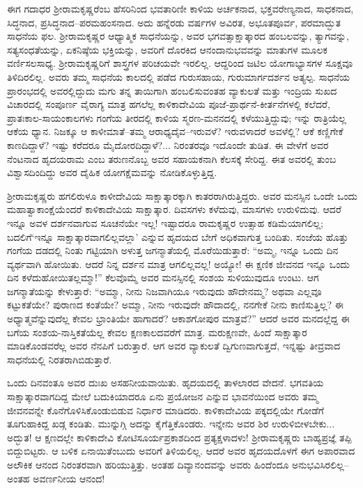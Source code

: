 ಈಗ ಗದಾಧರ ಶ್ರೀರಾಮಕೃಷ್ಣರೆಂಬ ಹೆಸರಿನಿಂದ ಭವತಾರಿಣೀ ಕಾಳಿಯ ಅರ್ಚಕನಾದ, ಭಕ್ತವರೇಣ್ಯನಾದ, ಸಾಧಕನಾದ, ಸಿದ್ಧನಾದ, ಪ್ರಸಿದ್ಧನಾದ–ಪರಮಹಂಸನಾದ. ಅದು ಹನ್ನೆರಡು ವರ್ಷಗಳ ಅವಿರತ, ಅಭೂತಪೂರ್ವ, ಪರಮಾದ್ಭುತ ಸಾಧನೆಯ ಫಲ. ಶ್ರೀರಾಮಕೃಷ್ಣರ ಆಧ್ಯಾತ್ಮಿಕ ಸಾಧನೆಯನ್ನು, ಅವರ ಭಗವತ್ಸಾಕ್ಷಾತ್ಕಾರದ ಹಂಬಲವನ್ನು, ತ್ಯಾಗವನ್ನು, ಸತ್ಯಸಂಧತೆಯನ್ನು, ಏಕನಿಷ್ಠೆಯ ಭಕ್ತಿಯನ್ನು, ಅವರಿಗೆ ದೊರಕಿದ ಆನಂದಾನುಭವವನ್ನು ಮಾತುಗಳ ಮೂಲಕ ವರ್ಣಿಸಲಸಾಧ್ಯ. ಶ್ರೀರಾಮಕೃಷ್ಣರಿಗೆ ಶಾಸ್ತ್ರಗಳ ಪರಿಚಯವೇ ಇರಲಿಲ್ಲ. ಆದ್ದರಿಂದ ಜಟಿಲ ಯೋಗಾಭ್ಯಾಸಗಳ ಸೂಕ್ಷವೂ ತಿಳಿದಿರಲಿಲ್ಲ. ಅವರು ತಮ್ಮ ಸಾಧನೆಯ ಕಾಲದಲ್ಲಿ ಪಡೆದ ಗುರುಸಹಾಯ, ಗುರುಮಾರ್ಗದರ್ಶನ ಅತ್ಯಲ್ಪ. ಸಾಧನೆಯ ಪ್ರಾರಂಭದಲ್ಲಿ ಅವರಲ್ಲಿದ್ದುದು ಮಗು ತನ್ನ ತಾಯಿಗಾಗಿ ಹಂಬಲಿಸುವಂತಹ ವ್ಯಾಕುಲತೆ ಮತ್ತು ಇಂದ್ರಿಯ ಸುಖದ ವಿಚಾರದಲ್ಲಿ ಸಂಪೂರ್ಣ ವೈರಾಗ್ಯ ಮಾತ್ರ ಹಗಲೆಲ್ಲ ಕಾಳಿಕಾದೇವಿಯ ಪೂಜೆ-ಪ್ರಾರ್ಥನೆ-ಕೀರ್ತನೆಗಳಲ್ಲಿ ಕಲೆದರೆ, ಪ್ರಾತಃಕಾಲ-ಸಾಯಂಕಾಲಗಳು ಗಂಗೆಯ ತೀರದಲ್ಲಿ ಕಾಳಿಯ ಸ್ಮರಣ-ಮನನದಲ್ಲಿ ಕಳೆಯುತ್ತಿದ್ದುವು; ಇನ್ನು ರಾತ್ರಿಯೆಲ್ಲ ಆಕೆಯ ಧ್ಯಾನ. ನಿಜಕ್ಕೂ ಆ ಕಾಳೀಮಾತೆ–ತಮ್ಮ ಆರಾಧ್ಯದೈವ–ಇರುವಳೆ? ಇರುವಳಾದರೆ ಅವಳೆಲ್ಲಿ? ಆಕೆ ಕಣ್ಣಿಗೇಕೆ ಕಾಣದಿದ್ದಾಳೆ? ಇಷ್ಟು ಕರೆದರೂ ಮೈದೋರದಿದ್ದಾಳೆ?... ನಿರಂತರವೂ ಇದೊಂದೇ ತುಡಿತ. ಈ ವೇಳೆಗೆ ಅವರ ನೆಂಟನಾದ ಹೃದಯರಾಮ ಎಂಬ ತರುಣನೊಬ್ಬ ಅವರ ಸಹಾಯಕನಾಗಿ ಕೆಲಸಕ್ಕೆ ಸೇರಿದ್ದ. ಈತ ಅವರಲ್ಲಿ ತುಂಬ ವಿಶ್ವಾಸದಿಂದಿದ್ದು ಅವರ ದೈಹಿಕ ಯೋಗಕ್ಷೆಮವನ್ನು ನೋಡಿಕೊಳ್ಳುತ್ತಿದ್ದ.

ಶ್ರೀರಾಮಕೃಷ್ಣರು ಹಗಲಿರುಳೂ ಕಾಳೀದೇವಿಯ ಸಾಕ್ಷಾತ್ಕಾರಕ್ಕಾಗಿ ಕಾತರರಾಗಿರುತ್ತಿದ್ದರು. ಅವರ ಮನಸ್ಸಿನ ಒಂದೇ ಒಂದು ಮಹಾತ್ವಾಕಾಂಕ್ಷೆಯೆಂದರೆ ಕಾಳಿಕಾದೇವಿಯ ಸಾಕ್ಷಾತ್ಕಾರ. ದಿವಸಗಳು ಕಳೆದುವು, ಮಾಸಗಳು ಉರುಳಿದುವು. ಆದರೆ ಇನ್ನೂ ಅವಳ ದರ್ಶನವಾಗುವ ಸೂಚನೆಯೇ ಇಲ್ಲ! ಇಷ್ಟಾದರೂ ರಾಮಕೃಷ್ಣರ ಉತ್ಸಾಹ ಕಡಿಮೆಯಾಗಲಿಲ್ಲ; ಬದಲಿಗೆ‘ಇನ್ನೂ ಸಾಕ್ಷಾತ್ಕಾರವಾಗಲಿಲ್ಲವಲ್ಲಾ’ ಎನ್ನುವ ಹೃದಯದ ಬೇಗೆ ಅಧಿಕವಾಗುತ್ತ ಬಂದಿತು. ಸಂಜೆಯ ಹೊತ್ತು ಗಂಗೆಯ ದಡದಲ್ಲಿ ನಿಂತು ಗಟ್ಟಿಯಾಗಿ ಅಳುತ್ತ ಜಗನ್ಮಾತೆಯಲ್ಲಿ ಮೊರೆಯಿಡುತ್ತಾರೆ: “ಅಮ್ಮ, ಇನ್ನೂ ಒಂದು ದಿನ ವ್ಯರ್ಥವಾಗಿ ಹೋಯಿತು. ಆದರೆ ನಿನ್ನ ದರ್ಶನ ಮಾತ್ರ ಆಗಲಿಲ್ಲವಲ್ಲ! ಅಯ್ಯೋ! ಈ ಕ್ಷಣಿಕ ಜೀವನದ ಇನ್ನೂ ಒಂದು ದಿನ ಕಳೆದುಹೋಯಿತಲ್ಲಮ್ಮಾ!” ಕೆಲವೊಮ್ಮೆ ಅವರ ಮನಸ್ಸಿನಲ್ಲಿ ಸಂಶಯ ಸುಳಿಯುವುದೂ ಉಂಟು. ಆಗ ಜಗನ್ಮಾತೆಯನ್ನು ಕೇಳುತ್ತಾರೆ: “ಅಮ್ಮಾ, ನೀನು ನಿಜವಾಗಿಯೂ ಇರುವುದು ಹೌದೇನಮ್ಮ? ಅಥವಾ ಎಲ್ಲವೂ ಕಟ್ಟುಕತೆಯೇ? ಪುರಾಣದ ಕಂತೆಯೇ? ಅಮ್ಮಾ, ನೀನು ಇರುವುದೇ ಹೌದಾದಲ್ಲಿ, ನನಗೇಕೆ ನೀನು ಕಾಣಿಸುತ್ತಿಲ್ಲ? ಈ ಅಧ್ಯಾತ್ಮವೆನ್ನುವುದೆಲ್ಲ ಕೇವಲ ಭ್ರಾಂತಿಯೇ ಹಾಗಾದರೆ? ಆಕಾಶಗೋಪುರ ಮಾತ್ರವೆ?” ಆದರೆ ಅವರ ಮನದಲ್ಲೆದ್ದ ಈ ಬಗೆಯ ಸಂಶಯ-ನಾಸ್ತಿಕತೆಯೆಲ್ಲ ಕೇವಲ ಕ್ಷಣಕಾಲದವರೆಗೆ ಮಾತ್ರ. ಮರುಕ್ಷಣವೇ, ಹಿಂದೆ ಸಾಕ್ಷಾತ್ಕಾರ ಮಾಡಿಕೊಂಡವರೆಲ್ಲ ಅವರ ನೆನಪಿಗೆ ಬರುತ್ತಾರೆ. ಆಗ ಅವರ ವ್ಯಾಕುಲತೆ ದ್ವಿಗುಣವಾಗುತ್ತದೆ, ಇನ್ನಷ್ಟು ತೀವ್ರವಾದ ಸಾಧನೆಯಲ್ಲಿ ನಿರತರಾಗಿಬಿಡುತ್ತಾರೆ.

ಒಂದು ದಿನವಂತೂ ಅವರ ದುಃಖ ಅಸಹನೀಯವಾಯಿತು. ಹೃದಯದಲ್ಲಿ ತಾಳಲಾರದ ವೇದನೆ. ಭಗವತಿಯ ಸಾಕ್ಷಾತ್ಕಾರವಾಗದಿದ್ದ ಮೇಲೆ ಬದುಕಿಯಾದರೂ ಏನು ಪ್ರಯೋಜನ ಎನ್ನುವ ಭಾವನೆಯಿಂದ ಅವರು ತಮ್ಮ ಜೀವನವನ್ನೇ ಕೊನೆಗೊಳಿಸಿಕೊಂಡುಬಿಡುವ ನಿರ್ಧಾರ ಮಾಡಿದರು. ಕಾಳಿಕಾದೇವಿಯ ಪಕ್ಕದಲ್ಲಿಯೇ ಗೋಡೆಗೆ ತೂಗುಹಾಕಿದ್ದ ಖಡ್ಗ ಕಂಡಿತು. ಮುನ್ನುಗ್ಗಿ ಅದನ್ನು ಕೈಗೆತ್ತಿಕೊಂಡರು. ಇನ್ನೇನು ಅವರ ಶಿರ ಉರುಳಿಬೀಳಬೇಕು... ಅದ್ಭುತ! ಆ ಕ್ಷಣದಲ್ಲೇ ಕಾಳಿಕಾದೇವಿ ಕೋಟಿಸೂರ್ಯಪ್ರಕಾಶದಿಂದ ಪ್ರತ್ಯಕ್ಷಳಾದಳು! ಶ್ರೀರಾಮಕೃಷ್ಣರು ಬಾಹ್ಯಪ್ರಜ್ಞೆ ತಪ್ಪಿ ಬಿದ್ದುಬಿಟ್ಟರು. ಆ ಬಳಿಕ ಏನಾಯಿತೆಂಬುದು ಅವರಿಗೆ ತಿಳಿಯಲಿಲ್ಲ. ಆದರೆ ಅವರ ಹೃದಯದೊಳಗೆ ಈಗ ಅಪಾರವಾದ ಅಲೌಕಿಕ ಆನಂದ ನಿರಂತರವಾಗಿ ಹರಿಯುತ್ತಿತ್ತು. ಅಂತಹ ದಿವ್ಯಾನಂದವನ್ನು ಅವರು ಹಿಂದೆಂದೂ ಅನುಭವಿಸಿರಲಿಲ್ಲ–ಅಂತಹ ಅವರ್ಣನೀಯ ಆನಂದ!

